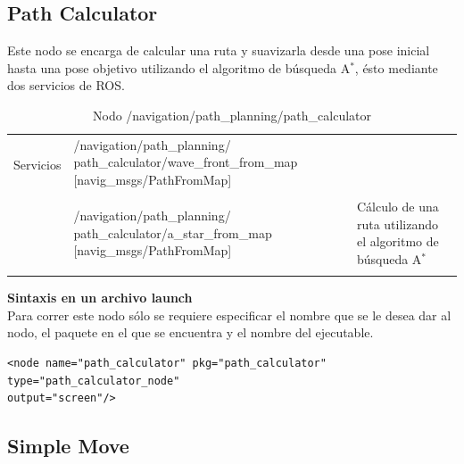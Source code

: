 \documentclass[a4paper,usenames,dvipsnames,svgnames,table]{book}
\begin{document}
\subsection{Path Calculator}
Este nodo se encarga de calcular una ruta y suavizarla desde una pose inicial hasta una pose objetivo utilizando el algoritmo de búsqueda A$ ^{*} $, ésto mediante dos servicios de ROS.\\
\begin{table}[H]
\begin{center}
\begin{tabular}{|l|p{6cm}|p{5cm}|}%
\hline

\multirow{2}{*}{Servicios}
& /navigation/path\_planning/ \newline path\_calculator/wave\_front\_from\_map [navig\_msgs/PathFromMap] &  \\
& & \\
& /navigation/path\_planning/ \newline path\_calculator/a\_star\_from\_map [navig\_msgs/PathFromMap] & Cálculo de una ruta utilizando el algoritmo de búsqueda A$ ^{*} $ \\
& & \\
\cline{1-3}

\end{tabular}
\caption{Nodo /navigation/path\_planning/path\_calculator}
\label{path calculator node}
\end{center}
\end{table}

\textbf{Sintaxis en un archivo launch}\\
Para correr este nodo sólo se requiere especificar el nombre que se le desea dar al nodo, el paquete en el que se encuentra y el nombre del ejecutable.\\
\begin{verbatim}
<node name="path_calculator" pkg="path_calculator" type="path_calculator_node" 
output="screen"/>
\end{verbatim}

\subsection{Simple Move}
\end{document}

